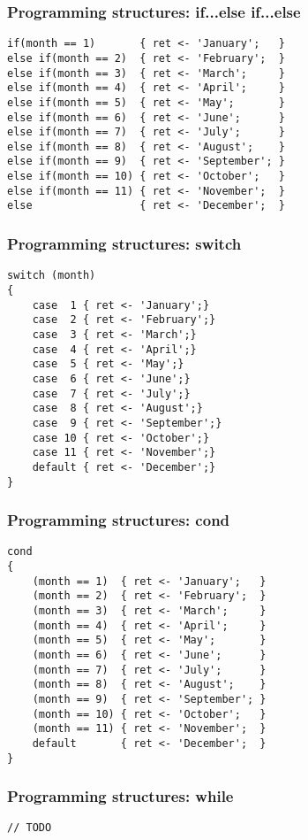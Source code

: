 \documentclass[11pt]{beamer}
\begin{document}
\begin{frame}[fragile]
\frametitle{Programming structures: if...else if...else}
\small
\begin{lstlisting}[language=lekta]
if(month == 1)       { ret <- 'January';   }
else if(month == 2)  { ret <- 'February';  }
else if(month == 3)  { ret <- 'March';     }
else if(month == 4)  { ret <- 'April';     }
else if(month == 5)  { ret <- 'May';       }
else if(month == 6)  { ret <- 'June';      }
else if(month == 7)  { ret <- 'July';      }
else if(month == 8)  { ret <- 'August';    }
else if(month == 9)  { ret <- 'September'; }
else if(month == 10) { ret <- 'October';   }
else if(month == 11) { ret <- 'November';  }
else                 { ret <- 'December';  }
\end{lstlisting}
\end{frame}

\begin{frame}[fragile]
\frametitle{Programming structures: switch}
\small
\begin{lstlisting}[language=lekta]
switch (month) 
{
	case  1 { ret <- 'January';}
	case  2 { ret <- 'February';}
	case  3 { ret <- 'March';}
	case  4 { ret <- 'April';}
	case  5 { ret <- 'May';}
	case  6 { ret <- 'June';}
	case  7 { ret <- 'July';}
	case  8 { ret <- 'August';}
	case  9 { ret <- 'September';}
	case 10 { ret <- 'October';}
	case 11 { ret <- 'November';}
	default { ret <- 'December';}
}
\end{lstlisting}
\end{frame}

\begin{frame}[fragile]
\frametitle{Programming structures: cond}
\small
\begin{lstlisting}[language=lekta]
cond
{
	(month == 1)  { ret <- 'January';   }
	(month == 2)  { ret <- 'February';  }
	(month == 3)  { ret <- 'March';     }
	(month == 4)  { ret <- 'April';     }
	(month == 5)  { ret <- 'May';       }
	(month == 6)  { ret <- 'June';      }
	(month == 7)  { ret <- 'July';      }
	(month == 8)  { ret <- 'August';    }
	(month == 9)  { ret <- 'September'; }
	(month == 10) { ret <- 'October';   }
	(month == 11) { ret <- 'November';  }
	default       { ret <- 'December';  }
}
\end{lstlisting}
\end{frame}

\begin{frame}[fragile]
\frametitle{Programming structures: while}
\begin{lstlisting}[language=lekta]
// TODO
\end{lstlisting}
\end{frame}
\end{document}
